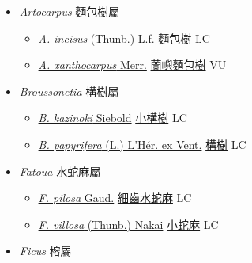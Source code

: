 
  \begin{itemize}
 \item[] \textit{Artocarpus} 麵包樹屬
                    
  \begin{itemize}
        \item[] \href{http://www.theplantlist.org/tpl1.1/search?q=Artocarpus+incisus}{\textit{A. incisus} (Thunb.) L.f.}   \href{\detokenize{http://taibnet.sinica.edu.tw/chi/taibnet_species_list.php?T2=麵包樹&T2_new_value=true&fr=y}}{麵包樹} LC
        \item[] \href{http://www.theplantlist.org/tpl1.1/search?q=Artocarpus+xanthocarpus}{\textit{A. xanthocarpus} Merr.}   \href{\detokenize{http://taibnet.sinica.edu.tw/chi/taibnet_species_list.php?T2=蘭嶼麵包樹&T2_new_value=true&fr=y}}{蘭嶼麵包樹} VU
  \end{itemize}
 \item[] \textit{Broussonetia} 構樹屬
                    
  \begin{itemize}
        \item[] \href{http://www.theplantlist.org/tpl1.1/search?q=Broussonetia+kazinoki}{\textit{B. kazinoki} Siebold}   \href{\detokenize{http://taibnet.sinica.edu.tw/chi/taibnet_species_list.php?T2=小構樹&T2_new_value=true&fr=y}}{小構樹} LC
        \item[] \href{http://www.theplantlist.org/tpl1.1/search?q=Broussonetia+papyrifera}{\textit{B. papyrifera} (L.) L'Hér. ex Vent.}   \href{\detokenize{http://taibnet.sinica.edu.tw/chi/taibnet_species_list.php?T2=構樹&T2_new_value=true&fr=y}}{構樹} LC
  \end{itemize}
 \item[] \textit{Fatoua} 水蛇麻屬
                    
  \begin{itemize}
        \item[] \href{http://www.theplantlist.org/tpl1.1/search?q=Fatoua+pilosa}{\textit{F. pilosa} Gaud.}   \href{\detokenize{http://taibnet.sinica.edu.tw/chi/taibnet_species_list.php?T2=細齒水蛇麻&T2_new_value=true&fr=y}}{細齒水蛇麻} LC
        \item[] \href{http://www.theplantlist.org/tpl1.1/search?q=Fatoua+villosa}{\textit{F. villosa} (Thunb.) Nakai}   \href{\detokenize{http://taibnet.sinica.edu.tw/chi/taibnet_species_list.php?T2=小蛇麻&T2_new_value=true&fr=y}}{小蛇麻} LC
  \end{itemize}
 \item[] \textit{Ficus} 榕屬
                    

\end{itemize}
